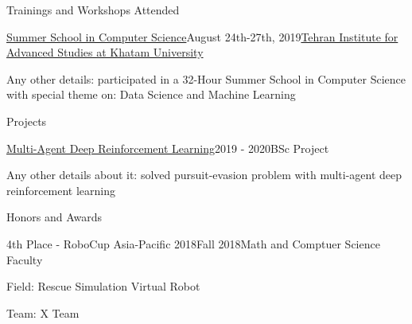 \documentclass{resume} %
\begin{document}
    \begin{rSection}{Trainings and Workshops Attended}
        \begin{rSubsection}{\href{https://link_to_your_degree.com}{\textcolor{coolblack}{Summer School in Computer Science}}}{August 24th-27th, 2019}{\href{https://teias.institute/data-science-and-machine-learning/}{\textcolor{coolblack}{Tehran Institute for Advanced Studies at Khatam University}}}{ }
            \item Any other details: participated in a 32-Hour Summer School in Computer Science with special theme on: Data Science and Machine Learning
        \end{rSubsection}
    \end{rSection}

    \begin{rSection}{Projects}
        \begin{rSubsection}{\href{https://link_to_your_project}{\textcolor{coolblack}{Multi-Agent Deep Reinforcement Learning}}}{2019 - 2020}{BSc Project}{ }
            \item Any other details about it: solved pursuit-evasion problem with multi-agent deep reinforcement learning
        \end{rSubsection}
    \end{rSection}

    \begin{rSection}{Honors and Awards}
        \begin{rSubsection}{4th Place - RoboCup Asia-Pacific 2018}{Fall 2018}{Math and Comptuer Science Faculty}{ }
            \item Field: Rescue Simulation Virtual Robot
            \item Team: X Team
        \end{rSubsection}
    \end{rSection}
\end{document}
